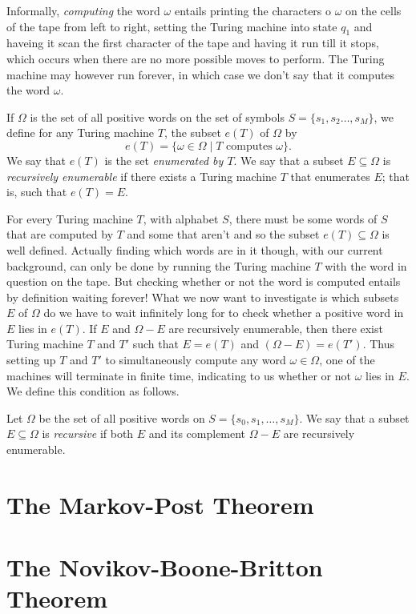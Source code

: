 Informally, \emph{computing} the word $\omega$ entails printing the characters o $\omega$ on the cells of the tape from left to right, setting the Turing machine into state $q_1$ and haveing it scan the first character of the tape and having it run till it stops, which occurs when there are no more possible moves to perform. The Turing machine may however run forever, in which case we don't say that it computes the word $\omega$.

\begin{definition}
  If $\Omega$ is the set of all positive words on the set of symbols $S = \{s_1, s_2 \dots, s_M\}$, we define for any Turing machine $T$, the subset $e(T)$ of $\Omega$ by
  \begin{equation*}
    e(T) = \{\omega \in \Omega \mid T \text{ computes } \omega\}.
  \end{equation*}
  We say that $e(T)$ is the set \emph{enumerated by $T$}. We say that a subset $E \subseteq \Omega$ is \emph{recursively enumerable} if there exists a Turing machine $T$ that enumerates $E$; that is, such that  $e(T) = E$.
\end{definition}

For every Turing machine $T$, with alphabet $S$, there must be some words of $S$ that are computed by $T$ and some that aren't and so the subset $e(T) \subseteq \Omega$ is well defined. Actually finding which words are in it though, with our current background, can only be done by running the Turing machine $T$ with the word in question on the tape. But checking whether or not the word is computed entails by definition waiting forever! What we now want to investigate is which subsets $E$ of $\Omega$ do we have to wait infinitely long for to check whether a positive word in $E$ lies in $e(T)$. If $E$ and $\Omega - E$ are recursively enumerable, then there exist Turing machine $T$ and $T'$ such that $E = e(T)$ and $(\Omega - E) = e(T')$. Thus setting up $T$ and $T'$ to simultaneously compute any word $\omega \in \Omega$, one of the machines will terminate in finite time, indicating to us whether or not $\omega$ lies in $E$. We define this condition as follows.

\begin{definition}
  Let $\Omega$ be the set of all positive words on $S = \{s_0,s_1, \dots, s_M \}$. We say that a subset $E \subseteq \Omega$ is \emph{recursive} if both $E$ and its complement $\Omega - E$ are recursively enumerable.
\end{definition}
\section{The Markov-Post Theorem}
\section{The Novikov-Boone-Britton Theorem}